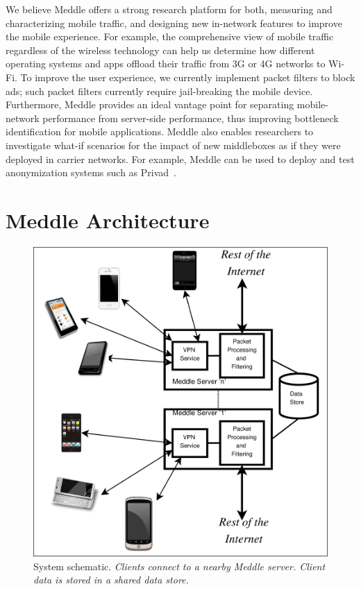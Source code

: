 \documentclass{sig-alternate-10pt}
\newcommand{\meddle}{{Meddle}\xspace}
\begin{document}
We believe \meddle offers a strong research platform for both,
measuring and characterizing mobile traffic, and designing new
in-network features to improve the mobile experience. For example, the
comprehensive view of mobile traffic regardless of the wireless
technology can help us determine how different operating systems and
apps offload their traffic from 3G or 4G networks to Wi-Fi. To
improve the user experience, we currently implement packet filters
to block ads; such packet filters currently require
jail-breaking the mobile device. Furthermore, Meddle provides an ideal
vantage point for separating mobile-network performance from
server-side performance, thus improving bottleneck identification for
mobile applications. \meddle also enables researchers to investigate
what-if scenarios for the impact of new middleboxes as if they were
deployed in carrier networks. For example, \meddle can be used to
deploy and test anonymization systems such as
Privad~\cite{guha:privad}.

\section{\meddle Architecture}

\begin{figure}
  \centering
  \includegraphics[width=0.65\columnwidth]{figures/meddle-servers.pdf}
  \caption{System schematic. \emph{Clients connect to a nearby \meddle
      server. Client data is stored in a shared data store.}} 
  \label{fig:MeddleDeployment}
\vspace{-0.08in}
\end{figure}
\end{document}
